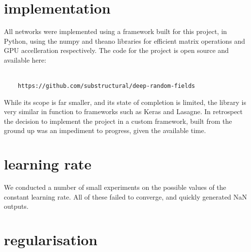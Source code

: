 \documentclass[msc]{infthesis}
\begin{document}
\section{implementation}

All networks were implemented using a framework built for this project, in Python, using the numpy and
theano libraries for efficient matrix operations and GPU accelleration respectively.  The code for the
project is open source and available here:
\begin{verbatim}

    https://github.com/substructural/deep-random-fields

\end{verbatim}
While its scope is far smaller, and its state of completion is limited, the library is very similar in
function to frameworks such as Keras and Lasagne.  In retrospect the decision to implement the project
in a custom framework, built from the ground up was an impediment to progress, given the available
time.



\section{learning rate}

We conducted a number of small experiments on the possible values of the constant learning rate.  All
of these failed to converge, and quickly generated NaN outputs.


\section{regularisation}
\end{document}
